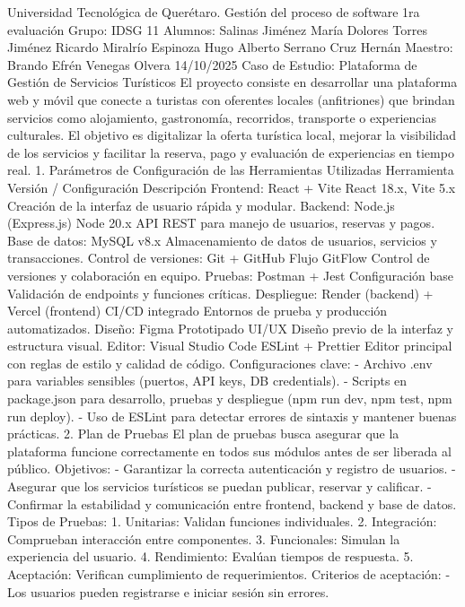 Universidad Tecnológica de Querétaro.
Gestión del proceso de software
1ra evaluación
Grupo: IDSG 11
Alumnos:
Salinas Jiménez María Dolores
Torres Jiménez Ricardo
Miralrío Espinoza Hugo Alberto
Serrano Cruz Hernán
Maestro: Brando Efrén Venegas Olvera
14/10/2025
Caso de Estudio: Plataforma de Gestión de Servicios
Turísticos
El proyecto consiste en desarrollar una plataforma web y móvil que
conecte a turistas con oferentes locales (anfitriones) que brindan servicios
como alojamiento, gastronomía, recorridos, transporte o experiencias
culturales. El objetivo es digitalizar la oferta turística local, mejorar la
visibilidad de los servicios y facilitar la reserva, pago y evaluación de
experiencias en tiempo real.
1. Parámetros de Configuración de las Herramientas Utilizadas
Herramienta Versión /
Configuración
Descripción
Frontend: React + Vite React 18.x, Vite 5.x Creación de la interfaz
de usuario rápida y
modular.
Backend: Node.js
(Express.js)
Node 20.x API REST para manejo
de usuarios, reservas y
pagos.
Base de datos: MySQL v8.x Almacenamiento de
datos de usuarios,
servicios y
transacciones.
Control de versiones:
Git + GitHub
Flujo GitFlow Control de versiones y
colaboración en
equipo.
Pruebas: Postman +
Jest
Configuración base Validación de
endpoints y funciones
críticas.
Despliegue: Render
(backend) + Vercel
(frontend)
CI/CD integrado Entornos de prueba y
producción
automatizados.
Diseño: Figma Prototipado UI/UX Diseño previo de la
interfaz y estructura
visual.
Editor: Visual Studio
Code
ESLint + Prettier Editor principal con
reglas de estilo y
calidad de código.
Configuraciones clave:
- Archivo .env para variables sensibles (puertos, API keys, DB credentials).
- Scripts en package.json para desarrollo, pruebas y despliegue (npm run
dev, npm test, npm run deploy).
- Uso de ESLint para detectar errores de sintaxis y mantener buenas
prácticas.
2. Plan de Pruebas
El plan de pruebas busca asegurar que la plataforma funcione
correctamente en todos sus módulos antes de ser liberada al público.
Objetivos:
- Garantizar la correcta autenticación y registro de usuarios.
- Asegurar que los servicios turísticos se puedan publicar, reservar y
calificar.
- Confirmar la estabilidad y comunicación entre frontend, backend y base
de datos.
Tipos de Pruebas:
1. Unitarias: Validan funciones individuales.
2. Integración: Comprueban interacción entre componentes.
3. Funcionales: Simulan la experiencia del usuario.
4. Rendimiento: Evalúan tiempos de respuesta.
5. Aceptación: Verifican cumplimiento de requerimientos.
Criterios de aceptación:
- Los usuarios pueden registrarse e iniciar sesión sin errores.

